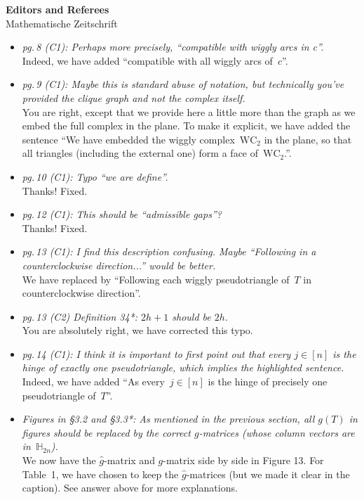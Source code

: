 \documentclass{letter}
\begin{document}
\begin{letter}{{\bf Editors and Referees} \\ Mathematische Zeitschrift}
\begin{itemize}
\item \textsl{\color{gray} pg.\,8 (C1): Perhaps more precisely, “compatible with wiggly arcs in c”.} \\
Indeed, we have added ``compatible with all wiggly arcs of~$c$''.

\item \textsl{\color{gray} pg.\,9 (C1): Maybe this is standard abuse of notation, but technically you’ve provided the clique graph and not the complex itself.} \\
You are right, except that we provide here a little more than the graph as we embed the full complex in the plane. To make it explicit, we have added the sentence ``We have embedded the wiggly complex~$\mathrm{WC}_2$ in the plane, so that all triangles (including the external one) form a face of~$\mathrm{WC}_2$.''.

\item \textsl{\color{gray} pg.\,10 (C1): Typo ``we are define''.} \\
Thanks! Fixed.

\item \textsl{\color{gray} pg.\,12 (C1): This should be ``admissible gaps''?} \\
Thanks! Fixed.

\item \textsl{\color{gray} pg.\,13 (C1): I find this description confusing. Maybe ``Following in a counterclockwise direction...'' would be better.} \\
We have replaced by ``Following each wiggly pseudotriangle of~$T$ in counterclockwise direction''.
\item \textsl{\color{gray} pg.\,13 (C2) Definition 34*: $2h + 1$ should be $2h$.} \\
You are absolutely right, we have corrected this typo.

\item \textsl{\color{gray} pg.\,14 (C1): I think it is important to first point out that every $j \in [n]$ is the hinge of exactly one pseudotriangle, which implies the highlighted sentence.} \\
Indeed, we have added ``As every~$j \in [n]$ is the hinge of precisely one pseudotriangle of~$T$''.

\item \textsl{\color{gray} Figures in §3.2 and §3.3*: As mentioned in the previous section, all $g(T)$ in figures should be replaced by the correct $g$-matrices (whose column vectors are in~$\mathbb{H}_{2n}$).} \\
We now have the $\hat{g}$-matrix and $g$-matrix side by side in Figure 13. For Table~1, we have chosen to keep the $\hat{g}$-matrices (but we made it clear in the caption). See answer above for more explanations.


\end{itemize}
\end{letter}
\end{document}
